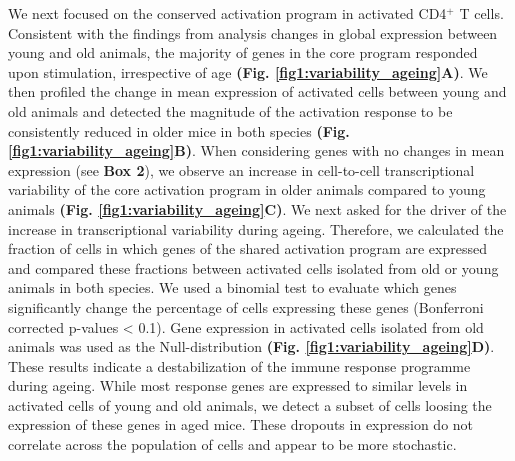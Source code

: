 We next focused on the conserved activation program in activated CD4$^+$ T cells. Consistent with the findings from analysis changes in global expression between young and old animals,  the majority of genes in the core program responded upon stimulation, irrespective of age \textbf{(Fig. \ref{fig1:variability_ageing}A)}. We then profiled the change in mean expression of activated cells between young and old animals and detected the magnitude of the activation response to be consistently reduced in older mice in both species \textbf{(Fig. \ref{fig1:variability_ageing}B)}. When considering genes with no changes in mean expression (see \textbf{Box 2}), we observe an increase in cell-to-cell transcriptional variability of the core activation program in older animals compared to young animals \textbf{(Fig. \ref{fig1:variability_ageing}C)}. We next asked for the driver of the increase in transcriptional variability during ageing. Therefore, we calculated the fraction of cells in which genes of the shared activation program are expressed and compared these fractions between activated cells isolated from old or young animals in both species. We used a binomial test to evaluate which genes significantly change the percentage of cells expressing these genes (Bonferroni corrected p-values < 0.1). Gene expression in activated cells isolated from old animals was used as the Null-distribution \textbf{(Fig. \ref{fig1:variability_ageing}D)}. \\

These results indicate a destabilization of the immune response programme during ageing. While most response genes are expressed to similar levels in activated cells of young and old animals, we detect a subset of cells loosing the expression of these genes in aged mice. These dropouts in expression do not correlate across the population of cells and appear to be more stochastic.

\newpage


